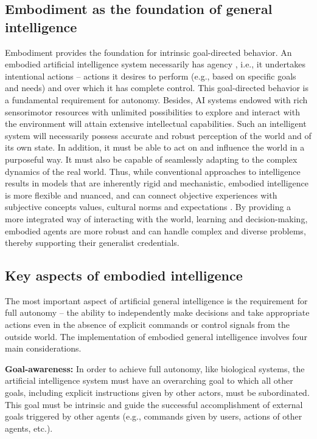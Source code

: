 \documentclass[10pt,journal,compsoc]{IEEEtran}
\begin{document}
	\subsection{Embodiment as the foundation of general intelligence}
	Embodiment provides the foundation for intrinsic goal-directed behavior. An embodied artificial intelligence system necessarily has agency \cite{swanepoel2021does,aagerfalk2020artificial}, i.e., it undertakes intentional actions – actions it desires to perform (e.g., based on specific goals and needs) and over which it has complete control. This goal-directed behavior is a fundamental requirement for autonomy. Besides, AI systems endowed with rich sensorimotor resources with unlimited possibilities to explore and interact with the environment will attain extensive intellectual capabilities.  Such an intelligent system will necessarily possess accurate and robust perception of the world and of its own state. In addition, it must be able to act on and influence the world in a purposeful way. It must also be capable of seamlessly adapting to the complex dynamics of the real world.  Thus, while conventional approaches to intelligence results in models that are inherently rigid and mechanistic, embodied intelligence is more flexible and nuanced, and can connect objective experiences with subjective concepts values, cultural norms and expectations \cite{williams2022belief}.  By providing a more integrated way of interacting with the world, learning and decision-making, embodied agents are more robust and can handle complex and diverse problems, thereby supporting their generalist credentials. 
	
	
	
	\subsection{Key aspects of embodied intelligence}
	The most important aspect of artificial general intelligence is the requirement for full autonomy – the ability to independently make decisions and take appropriate actions even in the absence of explicit commands or control signals from the outside world.  The implementation of embodied general intelligence involves four main considerations. 
	
	\textbf{Goal-awareness:} In order to achieve full autonomy, like biological systems, the artificial intelligence system must have an overarching goal to which all other goals, including explicit instructions given by other actors, must be subordinated. This goal must be intrinsic and guide the successful accomplishment of external goals triggered by other agents (e.g., commands given by users, actions of other agents, etc.).
	
\end{document}
